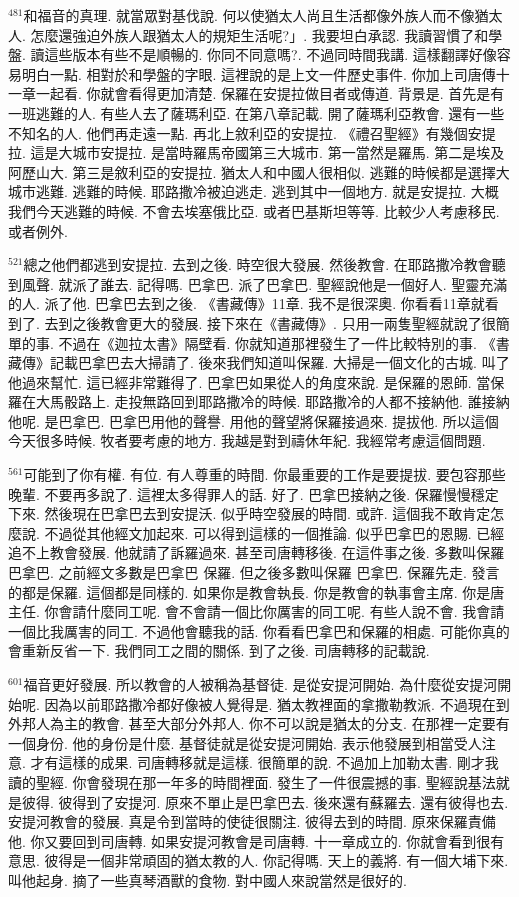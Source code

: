\documentclass{book}
\begin{document}
$^{481}$和福音的真理.
就當眾對基伐說.
何以使猶太人尚且生活都像外族人而不像猶太人.
怎麼還強迫外族人跟猶太人的規矩生活呢?」.
我要坦白承認.
我讀習慣了和學盤.
讀這些版本有些不是順暢的.
你同不同意嗎?.
不過同時間我講.
這樣翻譯好像容易明白一點.
相對於和學盤的字眼.
這裡說的是上文一件歷史事件.
你加上司唐傳十一章一起看.
你就會看得更加清楚.
保羅在安提拉做目者或傳道.
背景是.
首先是有一班逃難的人.
有些人去了薩瑪利亞.
在第八章記載.
開了薩瑪利亞教會.
還有一些不知名的人.
他們再走遠一點.
再北上敘利亞的安提拉.
《禮召聖經》有幾個安提拉.
這是大城市安提拉.
是當時羅馬帝國第三大城市.
第一當然是羅馬.
第二是埃及阿歷山大.
第三是敘利亞的安提拉.
猶太人和中國人很相似.
逃難的時候都是選擇大城市逃難.
逃難的時候.
耶路撒冷被迫逃走.
逃到其中一個地方.
就是安提拉.
大概我們今天逃難的時候.
不會去埃塞俄比亞.
或者巴基斯坦等等.
比較少人考慮移民.
或者例外.

$^{521}$總之他們都逃到安提拉.
去到之後.
時空很大發展.
然後教會.
在耶路撒冷教會聽到風聲.
就派了誰去.
記得嗎.
巴拿巴.
派了巴拿巴.
聖經說他是一個好人.
聖靈充滿的人.
派了他.
巴拿巴去到之後.
《書藏傳》11章.
我不是很深奧.
你看看11章就看到了.
去到之後教會更大的發展.
接下來在《書藏傳》.
只用一兩隻聖經就說了很簡單的事.
不過在《迦拉太書》隔壁看.
你就知道那裡發生了一件比較特別的事.
《書藏傳》記載巴拿巴去大掃請了.
後來我們知道叫保羅.
大掃是一個文化的古城.
叫了他過來幫忙.
這已經非常難得了.
巴拿巴如果從人的角度來說.
是保羅的恩師.
當保羅在大馬骰路上.
走投無路回到耶路撒冷的時候.
耶路撒冷的人都不接納他.
誰接納他呢.
是巴拿巴.
巴拿巴用他的聲譽.
用他的聲望將保羅接過來.
提拔他.
所以這個今天很多時候.
牧者要考慮的地方.
我越是對到禱休年紀.
我經常考慮這個問題.

$^{561}$可能到了你有權.
有位.
有人尊重的時間.
你最重要的工作是要提拔.
要包容那些晚輩.
不要再多說了.
這裡太多得罪人的話.
好了.
巴拿巴接納之後.
保羅慢慢穩定下來.
然後現在巴拿巴去到安提沃.
似乎時空發展的時間.
或許.
這個我不敢肯定怎麼說.
不過從其他經文加起來.
可以得到這樣的一個推論.
似乎巴拿巴的恩賜.
已經追不上教會發展.
他就請了訴羅過來.
甚至司唐轉移後.
在這件事之後.
多數叫保羅 巴拿巴.
之前經文多數是巴拿巴 保羅.
但之後多數叫保羅 巴拿巴.
保羅先走.
發言的都是保羅.
這個都是同樣的.
如果你是教會執長.
你是教會的執事會主席.
你是唐主任.
你會請什麼同工呢.
會不會請一個比你厲害的同工呢.
有些人說不會.
我會請一個比我厲害的同工.
不過他會聽我的話.
你看看巴拿巴和保羅的相處.
可能你真的會重新反省一下.
我們同工之間的關係.
到了之後.
司唐轉移的記載說.

$^{601}$福音更好發展.
所以教會的人被稱為基督徒.
是從安提河開始.
為什麼從安提河開始呢.
因為以前耶路撒冷都好像被人覺得是.
猶太教裡面的拿撒勒教派.
不過現在到外邦人為主的教會.
甚至大部分外邦人.
你不可以說是猶太的分支.
在那裡一定要有一個身份.
他的身份是什麼.
基督徒就是從安提河開始.
表示他發展到相當受人注意.
才有這樣的成果.
司唐轉移就是這樣.
很簡單的說.
不過加上加勒太書.
剛才我讀的聖經.
你會發現在那一年多的時間裡面.
發生了一件很震撼的事.
聖經說基法就是彼得.
彼得到了安提河.
原來不單止是巴拿巴去.
後來還有蘇羅去.
還有彼得也去.
安提河教會的發展.
真是令到當時的使徒很關注.
彼得去到的時間.
原來保羅責備他.
你又要回到司唐轉.
如果安提河教會是司唐轉.
十一章成立的.
你就會看到很有意思.
彼得是一個非常頑固的猶太教的人.
你記得嗎.
天上的義將.
有一個大埔下來.
叫他起身.
摘了一些真琴酒獸的食物.
對中國人來說當然是很好的.
\end{document}
